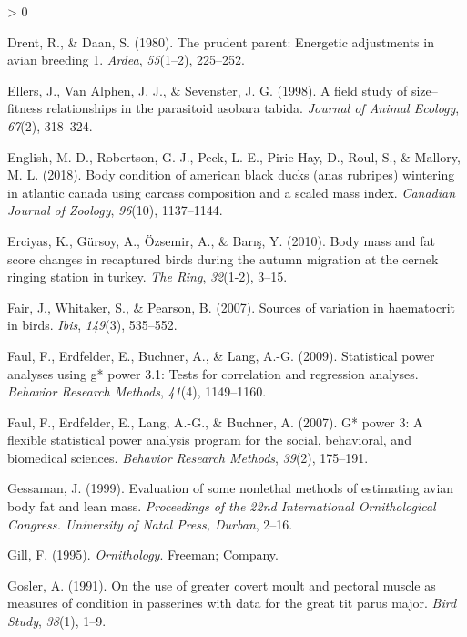 \documentclass[
]{article}
\newlength{\cslhangindent}
\newenvironment{CSLReferences}[2] %
 {%
  \setlength{\parindent}{0pt}
  \ifodd #1 \everypar{\setlength{\hangindent}{\cslhangindent}}\ignorespaces\fi
  \ifnum #2 > 0
  \setlength{\parskip}{#2\baselineskip}
  \fi
 }%
 {}
\begin{document}
\begin{CSLReferences}{1}{0}
\leavevmode\hypertarget{ref-drent1980prudent}{}%
Drent, R., \& Daan, S. (1980). The prudent parent: Energetic adjustments
in avian breeding 1. \emph{Ardea}, \emph{55}(1--2), 225--252.

\leavevmode\hypertarget{ref-ellers1998field}{}%
Ellers, J., Van Alphen, J. J., \& Sevenster, J. G. (1998). A field study
of size--fitness relationships in the parasitoid asobara tabida.
\emph{Journal of Animal Ecology}, \emph{67}(2), 318--324.

\leavevmode\hypertarget{ref-english2018body}{}%
English, M. D., Robertson, G. J., Peck, L. E., Pirie-Hay, D., Roul, S.,
\& Mallory, M. L. (2018). Body condition of american black ducks (anas
rubripes) wintering in atlantic canada using carcass composition and a
scaled mass index. \emph{Canadian Journal of Zoology}, \emph{96}(10),
1137--1144.

\leavevmode\hypertarget{ref-erciyas2010body}{}%
Erciyas, K., Gürsoy, A., Özsemir, A., \& Barış, Y. (2010). Body mass and
fat score changes in recaptured birds during the autumn migration at the
cernek ringing station in turkey. \emph{The Ring}, \emph{32}(1-2),
3--15.

\leavevmode\hypertarget{ref-fair2007sources}{}%
Fair, J., Whitaker, S., \& Pearson, B. (2007). Sources of variation in
haematocrit in birds. \emph{Ibis}, \emph{149}(3), 535--552.

\leavevmode\hypertarget{ref-faul2009statistical}{}%
Faul, F., Erdfelder, E., Buchner, A., \& Lang, A.-G. (2009). Statistical
power analyses using g* power 3.1: Tests for correlation and regression
analyses. \emph{Behavior Research Methods}, \emph{41}(4), 1149--1160.

\leavevmode\hypertarget{ref-faul2007g}{}%
Faul, F., Erdfelder, E., Lang, A.-G., \& Buchner, A. (2007). G* power 3:
A flexible statistical power analysis program for the social,
behavioral, and biomedical sciences. \emph{Behavior Research Methods},
\emph{39}(2), 175--191.

\leavevmode\hypertarget{ref-gessaman1999evaluation}{}%
Gessaman, J. (1999). Evaluation of some nonlethal methods of estimating
avian body fat and lean mass. \emph{Proceedings of the 22nd
International Ornithological Congress. University of Natal Press,
Durban}, 2--16.

\leavevmode\hypertarget{ref-gill1995ornithology}{}%
Gill, F. (1995). \emph{Ornithology}. Freeman; Company.

\leavevmode\hypertarget{ref-gosler1991use}{}%
Gosler, A. (1991). On the use of greater covert moult and pectoral
muscle as measures of condition in passerines with data for the great
tit parus major. \emph{Bird Study}, \emph{38}(1), 1--9.


\end{CSLReferences}
\end{document}
